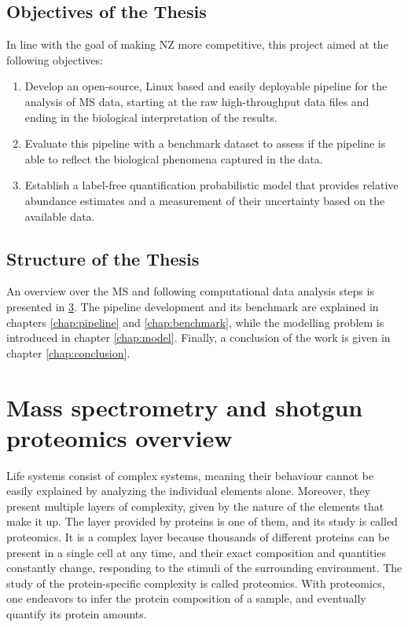 \documentclass[11pt, a4paper]{report}
\begin{document}
\section{Objectives of the Thesis}
\label{sec:objectives}

In line with the goal of making \ac{NZ} more competitive, this project aimed at the following objectives:

\begin{enumerate}

\item Develop an open-source, Linux based and easily deployable pipeline for the analysis of \ac{MS} data, starting at the raw high-throughput data files and ending in the  biological interpretation of the results.

\item Evaluate this pipeline with a benchmark dataset to assess if the pipeline is able to reflect the biological phenomena captured in the data.

\item Establish a label-free quantification probabilistic model that provides relative abundance estimates and a measurement of their uncertainty based on the available data.

\end{enumerate}

\section{Structure of the Thesis}

An overview over the \ac{MS} and following computational data analysis steps is presented in \ref{chap:mass_spec}. The pipeline development and its benchmark are explained in chapters \ref{chap:pipeline} and \ref{chap:benchmark}, while the modelling problem is introduced in chapter \ref{chap:model}. Finally, a conclusion of the work is given in chapter \ref{chap:conclusion}.


\chapter{Mass spectrometry and shotgun proteomics overview}
\label{chap:mass_spec}

Life systems consist of complex systems, meaning their behaviour cannot be easily explained by analyzing the individual elements alone. Moreover, they present multiple layers of complexity, given by the nature of the elements that make it up. The layer provided by proteins is one of them, and its study is called proteomics. It is a complex layer because thousands of different proteins can be present in a single cell at any time, and their exact composition and quantities constantly change, responding to the stimuli of the surrounding environment. The study of the protein-specific complexity is called proteomics. With proteomics, one endeavors to infer the protein composition of a sample, and eventually quantify its protein amounts.
\end{document}

